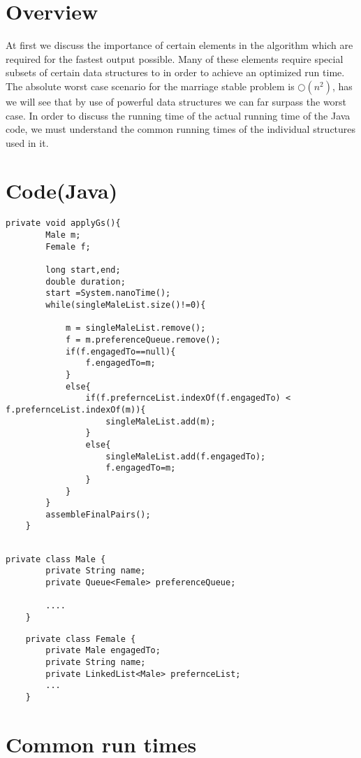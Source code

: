 \documentclass[a4paper,12pt]{article}
\begin{document}
 \section{Overview}
 	
At first we discuss the importance of certain elements in the algorithm which are required for the fastest output possible. Many of these elements require special subsets of certain data structures to in order to achieve an optimized run time. The absolute worst case scenario for the marriage stable problem is \(\bigcirc (n^2)\), has we will see that by use of powerful data structures we can far surpass the worst case. In order to discuss the running time of the actual running time of the Java code, we must understand the common running times of the individual structures used in it. 
  



\section{Code(Java)}

\begin{verbatim}
private void applyGs(){
		Male m;
		Female f;

		long start,end;
		double duration;
		start =System.nanoTime();
		while(singleMaleList.size()!=0){

			m = singleMaleList.remove();
			f = m.preferenceQueue.remove();
			if(f.engagedTo==null){
				f.engagedTo=m;
			}
			else{
				if(f.prefernceList.indexOf(f.engagedTo) < f.prefernceList.indexOf(m)){
					singleMaleList.add(m);
				}
				else{
					singleMaleList.add(f.engagedTo);
					f.engagedTo=m;
				}
			}
		}
		assembleFinalPairs();
	}	
\end{verbatim}


\begin{verbatim}

private class Male {
		private String name;
		private Queue<Female> preferenceQueue;

		....
	}
\end{verbatim}
\begin{verbatim}
	private class Female {
		private Male engagedTo;
		private String name;
		private LinkedList<Male> prefernceList;
		...
	}
\end{verbatim}


\section{Common run times }
\end{document}
